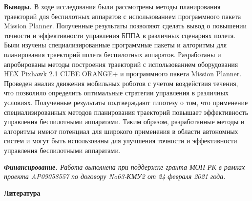 {\bfseries Выводы\emph{.}} В ходе исследования были рассмотрены методы
планирования траекторий для беспилотных аппаратов с использованием
программного пакета Mission Planner. Полученные результаты позволяют
сделать вывод о повышении точности и эффективности управления БППА в
различных сценариях полета. Были изучены специализированные программные
пакеты и алгоритмы для планирования траекторий полета беспилотных
аппаратов. Разработаны и апробированы методы построения траекторий с
использованием оборудования HEX Pixhawk 2.1 CUBE ORANGE+ и программного
пакета Mission Planner. Проведен анализ движения мобильных роботов с
учетом воздействия течения, что позволило определить оптимальные
стратегии управления в различных условиях. Полученные результаты
подтверждают гипотезу о том, что применение специализированных методов
планирования траекторий повышает эффективность управления беспилотными
аппаратами. Таким образом, разработанные методы и алгоритмы имеют
потенциал для широкого применения в области автономных систем и могут
быть использованы для улучшения точности и эффективности управления
беспилотными аппаратами.

\emph{{\bfseries Финансирование.} Работа выполнена при поддержке гранта МОН
РК в рамках проекта AP09058557 по договору No63-КМУ2 от 24 февраля 2021
года.}

\begin{center}
  {\bfseries Литература}
  \end{center}

